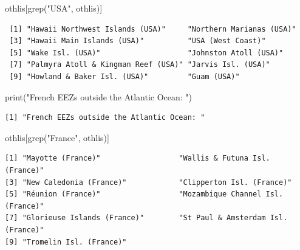 \documentclass[
  letterpaper,
  oneside,
  open=any]{scrbook}
\newenvironment{Shaded}{\begin{snugshade}}{\end{snugshade}}
\newcommand{\CommentTok}[1]{\textcolor[rgb]{0.37,0.37,0.37}{#1}}
\newcommand{\FunctionTok}[1]{\textcolor[rgb]{0.28,0.35,0.67}{#1}}
\newcommand{\NormalTok}[1]{\textcolor[rgb]{0.00,0.23,0.31}{#1}}
\newcommand{\SpecialCharTok}[1]{\textcolor[rgb]{0.37,0.37,0.37}{#1}}
\newcommand{\StringTok}[1]{\textcolor[rgb]{0.13,0.47,0.30}{#1}}
\begin{document}
\begin{Shaded}
\begin{Highlighting}[]
\NormalTok{othlis[}\FunctionTok{grep}\NormalTok{(}\StringTok{"USA"}\NormalTok{, othlis)]}
\end{Highlighting}
\end{Shaded}

\begin{verbatim}
 [1] "Hawaii Northwest Islands (USA)"     "Northern Marianas (USA)"           
 [3] "Hawaii Main Islands (USA)"          "USA (West Coast)"                  
 [5] "Wake Isl. (USA)"                    "Johnston Atoll (USA)"              
 [7] "Palmyra Atoll & Kingman Reef (USA)" "Jarvis Isl. (USA)"                 
 [9] "Howland & Baker Isl. (USA)"         "Guam (USA)"                        
\end{verbatim}

\begin{Shaded}
\begin{Highlighting}[]
\FunctionTok{print}\NormalTok{(}\StringTok{"French EEZs outside the Atlantic Ocean: "}\NormalTok{)}
\end{Highlighting}
\end{Shaded}

\begin{verbatim}
[1] "French EEZs outside the Atlantic Ocean: "
\end{verbatim}

\begin{Shaded}
\begin{Highlighting}[]
\NormalTok{othlis[}\FunctionTok{grep}\NormalTok{(}\StringTok{"France"}\NormalTok{, othlis)]}
\end{Highlighting}
\end{Shaded}

\begin{verbatim}
[1] "Mayotte (France)"                  "Wallis & Futuna Isl. (France)"    
[3] "New Caledonia (France)"            "Clipperton Isl. (France)"         
[5] "Réunion (France)"                  "Mozambique Channel Isl. (France)" 
[7] "Glorieuse Islands (France)"        "St Paul & Amsterdam Isl. (France)"
[9] "Tromelin Isl. (France)"           
\end{verbatim}

\begin{Shaded}
\end{Shaded}
\end{document}
